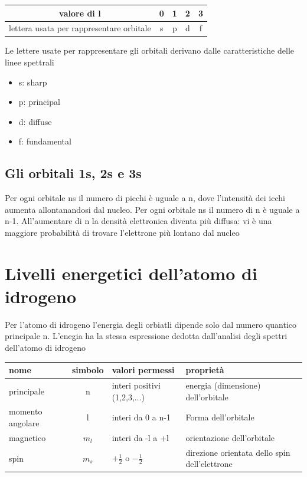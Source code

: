\documentclass[a4paper,11pt]{report}
\begin{document}
\begin{center}
\begin{tabular}{|c|c|c|c|c|}
	\hline
	valore di l & 0&1&2&3 \\
	\hline
	lettera usata per rappresentare orbitale &s&p&d&f \\
	\hline
\end{tabular} 
\end{center}

\noindent Le lettere usate per rappresentare gli orbitali derivano dalle caratteristiche delle linee spettrali

\begin{itemize}
	\item s: sharp
	\item p: principal
	\item d: diffuse
	\item f: fundamental
\end{itemize}

\subsection*{Gli orbitali 1s, 2s e 3s}

Per ogni orbitale ns il numero di picchi è uguale a n, dove l'intensità dei icchi aumenta allontanandosi dal nucleo.
Per ogni orbitale ns il numero di n è uguale a n-1.
All'aumentare di n la densità elettronica diventa più diffusa: vi è una maggiore probabilità di trovare l'elettrone più lontano dal nucleo

\section{Livelli energetici dell'atomo di idrogeno}

Per l'atomo di idrogeno l'energia degli orbiatli dipende solo dal numero quantico principale n. 
L'enegia ha la stessa espressione dedotta dall'analisi degli spettri dell'atomo di idrogeno

\begin{center}
	\begin{tabular}{lcll}
		nome & simbolo & valori permessi & proprietà \\
		\hline
		principale & n & interi positivi (1,2,3,$\dots$) & energia (dimensione) dell'orbitale \\
		momento angolare & l & interi da 0 a n-1 & Forma dell'orbitale \\
		magnetico & $m_l$ & interi da -l a +l & orientazione dell'orbitale \\
		spin & $m_s$ & $+\frac{1}{2}$ o $-\frac{1}{2}$ & direzione orientata dello spin dell'elettrone \\
		\hline
	\end{tabular}
\end{center}
\end{document}
